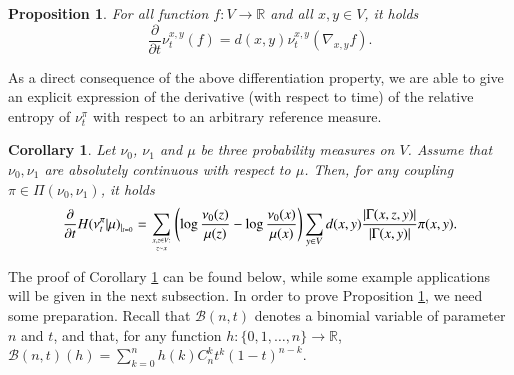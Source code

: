 \documentclass[11pt]{amsart}
\newtheorem{prop}[equation]{Proposition}
\newtheorem{cor}[equation]{Corollary}
\numberwithin{equation}{section}
\begin{document}
\begin{prop}  \label{paris}
For all  function $f \colon V \to {\mathbb{R}} $ and all $x,y \in V$, it holds
$$
\frac{\partial}{\partial t} \nu_t^{x,y}(f) =d(x,y) \nu_t^{x,y} ( \nabla_{x,y}f ) .
$$
\end{prop}

As a direct consequence of the above differentiation property, we are able to give an explicit expression of the derivative (with respect to time) of the relative entropy of $\nu_t^\pi$ with respect to an arbitrary reference measure.

\begin{cor} \label{parisbis}
Let $\nu_0$, $\nu_1$ and $\mu$ be three probability measures on $V$. Assume that 
$\nu_0, \nu_1$ are absolutely continuous with respect to $\mu$. 
Then, for any coupling $\pi \in \Pi(\nu_0,\nu_1)$, it holds
$$
\frac{\partial}{\partial t} H(\nu_t^\pi | \mu)_{|_{t=0}} 
= 
\sum_{\genfrac{}{}{0pt}{}{x,z \in V:}{z \sim x}} \left( \log  \frac{\nu_0(z)}{\mu(z)} - \log \frac{\nu_0(x)}{\mu(x)}  \right)
\sum_{y \in V} d(x,y)\frac{|\Gamma(x,z,y)|}{|\Gamma(x,y)|} \pi(x,y).
$$
\end{cor}

The proof of Corollary \ref{parisbis} can be found below, while some example applications 
will be given in the next subsection. In order to prove Proposition \ref{paris}, we need some preparation.
Recall that $\mathcal{B}(n,t)$ denotes a binomial variable of parameter $n$ and $t$, and that, for any function 
$h \colon \{0,1,\ldots,n\} \to {\mathbb{R}}$, $\mathcal{B}(n,t)(h)=\sum_{k=0}^n h(k)C_n^kt^{k}(1-t)^{n-k}$.
\end{document}
